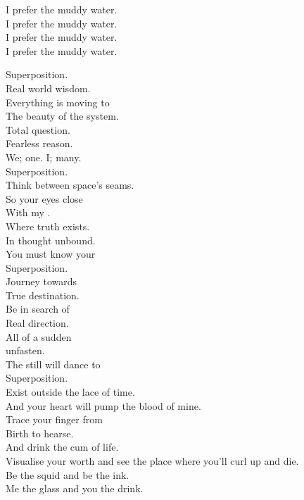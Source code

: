 I prefer the muddy water. \\
I prefer the muddy water. \\
I prefer the muddy water. \\
I prefer the muddy water. \\




Superposition. \\
Real world wisdom. \\
Everything is moving to \\
The beauty of the system. \\

Total question. \\
Fearless reason. \\
We; one. I; many. \\
Superposition. \\

Think between space's seams. \\
So your eyes close \\
With my . \\
Where truth exists. \\
In thought unbound. \\
You must know your \\
Superposition. \\

Journey towards \\
True destination. \\
Be in search of \\
Real direction. \\

All of a sudden \\
 unfasten. \\
The still will dance to \\
Superposition. \\

Exist outside the lace of time. \\
And your heart will pump the blood of mine. \\
Trace your finger from \\
Birth to hearse. \\
And drink the cum of life. \\
Visualise your worth and see the place where you'll curl up and die. \\
Be the squid and be the ink. \\
Me the glass and you the drink. \\


